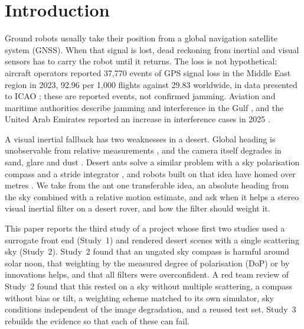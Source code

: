 \section{Introduction}
Ground robots usually take their position from a global navigation satellite system (GNSS). When that signal is lost, dead reckoning from inertial and visual sensors has to carry the robot until it returns. The loss is not hypothetical: aircraft operators reported 37,770 events of GPS signal loss in the Middle East region in 2023, 92.96 per 1,000 flights against 29.83 worldwide, in data presented to ICAO \cite{icao_wp69}; these are reported events, not confirmed jamming. Aviation and maritime authorities describe jamming and interference in the Gulf \cite{easa_sib, ukmto, mscio}, and the United Arab Emirates reported an increase in interference cases in 2025 \cite{uae_icao}.

A visual inertial fallback has two weaknesses in a desert. Global heading is unobservable from relative measurements \cite{hesch, vinsmono}, and the camera itself degrades in sand, glare and dust \cite{mer, madmax}. Desert ants solve a similar problem with a sky polarisation compass and a stride integrator \cite{ronacher, wittlinger, wehner03}, and robots built on that idea have homed over metres \cite{lambrinos, antbot}. We take from the ant one transferable idea, an absolute heading from the sky combined with a relative motion estimate, and ask when it helps a stereo visual inertial filter on a desert rover, and how the filter should weight it.

This paper reports the third study of a project whose first two studies used a surrogate front end (Study~1) and rendered desert scenes with a single scattering sky (Study~2). Study~2 found that an ungated sky compass is harmful around solar noon, that weighting by the measured degree of polarisation (DoP) or by innovations helps, and that all filters were overconfident. A red team review of Study~2 found that this rested on a sky without multiple scattering, a compass without bias or tilt, a weighting scheme matched to its own simulator, sky conditions independent of the image degradation, and a reused test set. Study~3 rebuilds the evidence so that each of these can fail.

